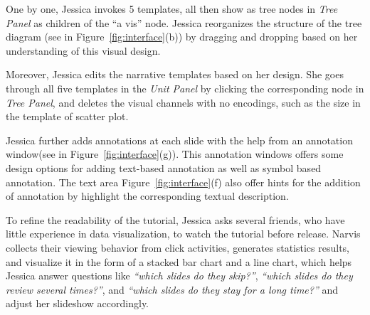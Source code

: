 One by one, Jessica invokes 5 templates, all then show as tree nodes in \textit{Tree Panel} as children of the ``a vis'' node. Jessica reorganizes the structure of the tree diagram (see in Figure~\ref{fig:interface}(b)) by dragging and dropping based on her understanding of this visual design. 

Moreover, Jessica edits the narrative templates based on her design. 
She goes through all five templates in the \textit{Unit Panel} by clicking the corresponding node in \textit{Tree Panel}, and deletes the visual channels with no encodings, such as the size in the template of scatter plot. 

Jessica further adds annotations at each slide with the help from an annotation window(see in Figure~\ref{fig:interface}(g)). This annotation windows offers some design options for adding text-based annotation as well as symbol based annotation.  The text area Figure~\ref{fig:interface}(f) also offer hints for the addition of annotation by highlight the corresponding textual description. 


To refine the readability of the tutorial, Jessica asks several friends, who have little experience in data visualization, to watch the tutorial before release. Narvis collects their viewing behavior from click activities, generates statistics results, and visualize it in the form of a stacked bar chart and a line chart, which helps Jessica answer questions like \textit{``which slides do they skip?''}, \textit{``which slides do they review several times?''}, and \textit{``which slides do they stay for a long time?''} and adjust her slideshow accordingly. 



